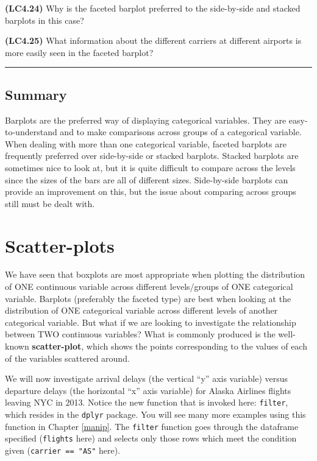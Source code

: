 \documentclass[]{tufte-book}
\begin{document}
\textbf{(LC4.24)} Why is the faceted barplot preferred to the
side-by-side and stacked barplots in this case?

\textbf{(LC4.25)} What information about the different carriers at
different airports is more easily seen in the faceted barplot?

\begin{center}\rule{\linewidth}{\linethickness}\end{center}

\subsection{Summary}\label{summary-2}

Barplots are the preferred way of displaying categorical variables. They
are easy-to-understand and to make comparisons across groups of a
categorical variable. When dealing with more than one categorical
variable, faceted barplots are frequently preferred over side-by-side or
stacked barplots. Stacked barplots are sometimes nice to look at, but it
is quite difficult to compare across the levels since the sizes of the
bars are all of different sizes. Side-by-side barplots can provide an
improvement on this, but the issue about comparing across groups still
must be dealt with.

\section{Scatter-plots}\label{scatter-plots}

We have seen that boxplots are most appropriate when plotting the
distribution of ONE continuous variable across different levels/groups
of ONE categorical variable. Barplots (preferably the faceted type) are
best when looking at the distribution of ONE categorical variable across
different levels of another categorical variable. But what if we are
looking to investigate the relationship between TWO continuous
variables? What is commonly produced is the well-known
\textbf{scatter-plot}, which shows the points corresponding to the
values of each of the variables scattered around.

We will now investigate arrival delays (the vertical ``y'' axis
variable) versus departure delays (the horizontal ``x'' axis variable)
for Alaska Airlines flights leaving NYC in 2013. Notice the new function
that is invoked here: \texttt{filter}, which resides in the
\texttt{dplyr} package. You will see many more examples using this
function in Chapter \ref{manip}. The \texttt{filter} function goes
through the dataframe specified (\texttt{flights} here) and selects only
those rows which meet the condition given (\texttt{carrier\ ==\ "AS"}
here).
\end{document}
